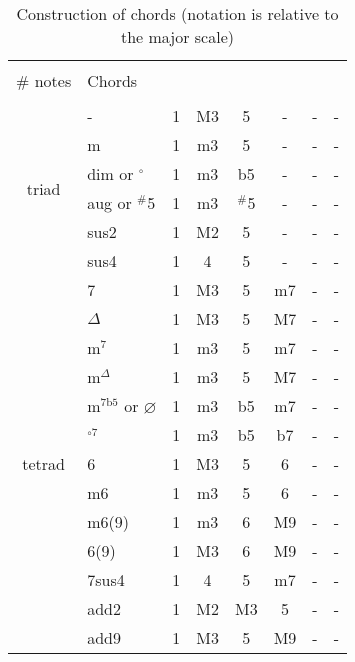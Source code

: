 \begin{table*}[!h]
	\centering
	\caption{Construction of chords (notation is relative to the major scale)}
	\begin{tabular}{clcccccc}
		\hline \vspace{-0.2cm} \\
		$\#$ notes & Chords & & & & & &\\
		\hline \vspace{-0.2cm} \\
		\multirow{6}{*}{triad} & -        & 1 & M3 & 5 &  -  & -  & -\\
		                       & m        & 1 & m3 & 5 &  -  & -  & -\\
		                       & dim or $^\circ$  & 1 & m3 & b5  &  -  & -  & -\\
		                       & aug or $^\#$5 & 1 & m3 & $^\#$5 &  -  & -  & -\\
		                       & sus2     & 1 & M2  & 5     &  -  & -  & -\\
		                       & sus4     & 1 & 4   & 5     &  -  & -  & -\\
		\hline
		\multirow{13}{*}{tetrad}& 7        & 1 & M3  & 5 & m7  & -  & -\\
		                       & $\Delta$  & 1 & M3  & 5 & M7  & -  & -\\
		                       & m$^7$     & 1 & m3  & 5 & m7  & -  & -\\
		                       & m$^\Delta$& 1 & m3  & 5 & M7  & -  & -\\
		                       & m$^{7\textrm{b}5}$ or $\varnothing$& 1 & m3  & b5 & m7  & -  & -\\
		                       & $^{\circ 7}$   & 1 & m3  & b5 & b7 & -  & -\\
                               & 6        & 1 & M3  & 5 & 6   & -  & -\\
                               & m6       & 1 & m3  & 5 & 6   & -  & -\\
		                       & m6(9)    & 1 & m3  & 6 & M9  & -  & -\\
		                       & 6(9)     & 1 & M3  & 6 & M9  & -  & -\\
		                       & 7sus4    & 1 & 4   & 5 & m7  & -  & -\\
		                       & add2     & 1 & M2  & M3& 5   & -  & -\\
		                       & add9     & 1 & M3  & 5 & M9  & -  & -\\

\end{tabular}
\end{table*}
